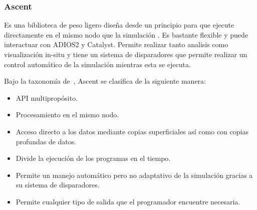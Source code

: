 \subsubsection{Ascent}
Es una biblioteca de peso ligero diseña desde un principio para que ejecute directamente en el mismo nodo que la simulación \cite{Larsen2022}. Es bastante flexible y puede interactuar con ADIOS2 y Catalyst. Permite realizar tanto analisis como visualización in-situ y tiene un sistema de disparadores que permite realizar un control automático de la simulación mientras esta se ejecuta.

Bajo la taxonomía de~\cite{childs_terminology_2020}, Ascent se clasifica de la siguiente manera:
\begin{itemize}
    \item API multipropósito.
    \item Procesamiento en el mismo nodo.
    \item Acceso directo a los datos mediante copias superficiales así como con copias profundas de datos.
    \item Divide la ejecución de los programas en el tiempo.
    \item Permite un manejo automático pero no adaptativo de la simulación gracias a su sistema de disparadores.
    \item Permite cualquier tipo de salida que el programador encuentre necesaria.
\end{itemize}